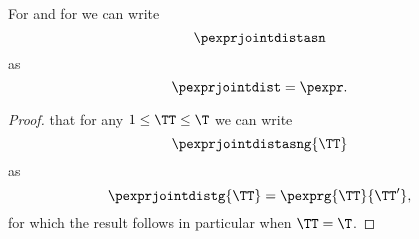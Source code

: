 \begin{proposition}
  For \ctext{\pexprdom} and for \ctext{\pexprdompol,} 
  we can write
  $$\pexprjointdistasn$$ as
  $$ \pexprjointdist = \pexpr.$$%
\end{proposition}

\begin{proof}
  that for any $1 \le \TT \le \T$
  we can write
  $$\pexprjointdistasng{\TT}$$ as
  $$ \pexprjointdistg{\TT} = \pexprg{\TT}{\TT'},$$
  for which the result follows in particular when $\TT = \T$.
\end{proof}
